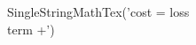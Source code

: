 \documentclass[preview]{standalone}
\begin{document}
\begin{center}
SingleStringMathTex('cost = loss\\ term +')
\end{center}
\end{document}
